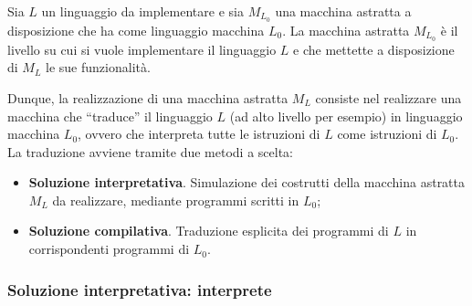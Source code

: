 \documentclass[a4paper]{article}
\newcommand{\dquotes}[1]{``#1''}
\begin{document}
	Sia $L$ un linguaggio da implementare e sia $M_{L_{0}}$ una macchina astratta a disposizione che ha come linguaggio macchina $L_{0}$. La macchina astratta $M_{L_{0}}$ è il livello su cui si vuole implementare il linguaggio $L$ e che mettette a disposizione di $M_{L}$ le sue funzionalità.\newline
	
	\noindent
	Dunque, la realizzazione di una macchina astratta $M_{L}$ consiste nel realizzare una macchina che \dquotes{traduce} il linguaggio $L$ (ad alto livello per esempio) in linguaggio macchina $L_{0}$, ovvero che interpreta tutte le istruzioni di $L$ come istruzioni di $L_{0}$. La traduzione avviene tramite due metodi a scelta:
	\begin{itemize}
		\item \textbf{Soluzione interpretativa}. Simulazione dei costrutti della macchina astratta $M_{L}$ da realizzare, mediante programmi scritti in $L_{0}$;
		\item \textbf{Soluzione compilativa}. Traduzione esplicita dei programmi di $L$ in corrispondenti programmi di $L_{0}$.
	\end{itemize}\newpage

	\subsubsection{Soluzione interpretativa: interprete}\label{interprete}
	
\end{document}
